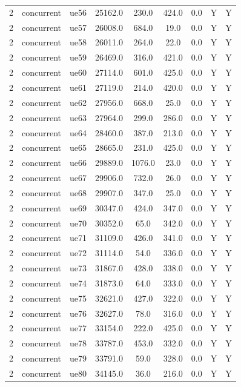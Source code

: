 \begin{table}[ht]
\begin{tabular}{|c|c|c|c|c|c|c|c|c|}
2 & concurrent & ue56 & 25162.0 & 230.0 & 424.0 & 0.0 & Y & Y \\
2 & concurrent & ue57 & 26008.0 & 684.0 & 19.0 & 0.0 & Y & Y \\
2 & concurrent & ue58 & 26011.0 & 264.0 & 22.0 & 0.0 & Y & Y \\
2 & concurrent & ue59 & 26469.0 & 316.0 & 421.0 & 0.0 & Y & Y \\
2 & concurrent & ue60 & 27114.0 & 601.0 & 425.0 & 0.0 & Y & Y \\
2 & concurrent & ue61 & 27119.0 & 214.0 & 420.0 & 0.0 & Y & Y \\
2 & concurrent & ue62 & 27956.0 & 668.0 & 25.0 & 0.0 & Y & Y \\
2 & concurrent & ue63 & 27964.0 & 299.0 & 286.0 & 0.0 & Y & Y \\
2 & concurrent & ue64 & 28460.0 & 387.0 & 213.0 & 0.0 & Y & Y \\
2 & concurrent & ue65 & 28665.0 & 231.0 & 425.0 & 0.0 & Y & Y \\
2 & concurrent & ue66 & 29889.0 & 1076.0 & 23.0 & 0.0 & Y & Y \\
2 & concurrent & ue67 & 29906.0 & 732.0 & 26.0 & 0.0 & Y & Y \\
2 & concurrent & ue68 & 29907.0 & 347.0 & 25.0 & 0.0 & Y & Y \\
2 & concurrent & ue69 & 30347.0 & 424.0 & 347.0 & 0.0 & Y & Y \\
2 & concurrent & ue70 & 30352.0 & 65.0 & 342.0 & 0.0 & Y & Y \\
2 & concurrent & ue71 & 31109.0 & 426.0 & 341.0 & 0.0 & Y & Y \\
2 & concurrent & ue72 & 31114.0 & 54.0 & 336.0 & 0.0 & Y & Y \\
2 & concurrent & ue73 & 31867.0 & 428.0 & 338.0 & 0.0 & Y & Y \\
2 & concurrent & ue74 & 31873.0 & 64.0 & 333.0 & 0.0 & Y & Y \\
2 & concurrent & ue75 & 32621.0 & 427.0 & 322.0 & 0.0 & Y & Y \\
2 & concurrent & ue76 & 32627.0 & 78.0 & 316.0 & 0.0 & Y & Y \\
2 & concurrent & ue77 & 33154.0 & 222.0 & 425.0 & 0.0 & Y & Y \\
2 & concurrent & ue78 & 33787.0 & 453.0 & 332.0 & 0.0 & Y & Y \\
2 & concurrent & ue79 & 33791.0 & 59.0 & 328.0 & 0.0 & Y & Y \\
2 & concurrent & ue80 & 34145.0 & 36.0 & 216.0 & 0.0 & Y & Y \\

\end{tabular}
\end{table}
